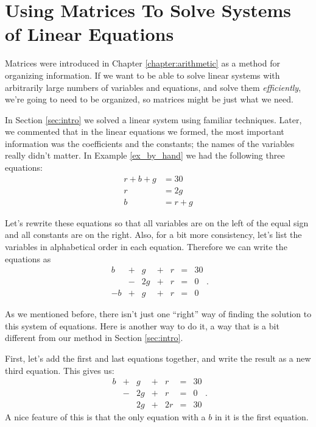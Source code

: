 \section{Using Matrices To Solve Systems of Linear Equations}\label{sec:matrices}


Matrices were introduced in Chapter \ref{chapter:arithmetic} as a method for organizing information. If we want to be able to solve linear systems with arbitrarily large numbers of variables and equations, and solve them \textit{efficiently}, we're going to need to be organized, so matrices might be just what we need.

In Section \ref{sec:intro} we solved a linear system using familiar techniques. Later, we commented that in the linear equations we formed, the most important information was the coefficients and the constants; the names of the variables really didn't matter. In Example \ref{ex_by_hand} we had the following three equations:
\begin{align*}
r+b+g&=30\\
r&=2g\\
b&=r+g
\end{align*}

Let's rewrite these equations so that all variables are on the left of the equal sign and all constants are on the right. Also, for a bit more consistency, let's list the variables in alphabetical order in each equation. Therefore we can write the equations as
\begin{equation}
\begin{array}{ccccccc}
b&+&g&+&r&=&30\\
 &-&2g&+&r&=&0\\
-b&+&g&+&r&=&0
\end{array}.\label{eq:before_matrix}
\end{equation}

As we mentioned before, there isn't just one ``right'' way of finding the solution to this system of equations. Here is another way to do it, a way that is a bit different from our method in Section \ref{sec:intro}. 

First, let's add the first and last equations together, and write the result as a new
third equation. This gives us:
\[
\begin{array}{ccccccc}
b&+&g&+&r&=&30\\
 &-&2g&+&r&=&0\\
 & &2g&+&2r&=&30
\end{array}.
\]
A nice feature of this is that the only equation with a $b$ in it is the first equation.

